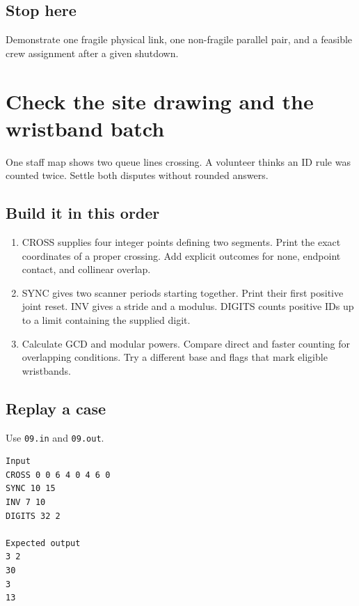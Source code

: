 \documentclass[11pt,letterpaper]{article}
\begin{document}
\subsection*{Stop here}

Demonstrate one fragile physical link, one non-fragile parallel pair, and a feasible crew assignment after a given shutdown.

\clearpage

\section{Check the site drawing and the wristband batch}\label{festival:09}

One staff map shows two queue lines crossing. A volunteer thinks an ID rule was counted twice. Settle both disputes without rounded answers.

\subsection*{Build it in this order}

\begin{enumerate}
\item CROSS supplies four integer points defining two segments. Print the exact coordinates of a proper crossing. Add explicit outcomes for none, endpoint contact, and collinear overlap.
\item SYNC gives two scanner periods starting together. Print their first positive joint reset. INV gives a stride and a modulus. DIGITS counts positive IDs up to a limit containing the supplied digit.
\item Calculate GCD and modular powers. Compare direct and faster counting for overlapping conditions. Try a different base and flags that mark eligible wristbands.
\end{enumerate}

\subsection*{Replay a case}

Use \texttt{09.in} and \texttt{09.out}.

\begin{samepage}
\small
\begin{verbatim}
Input
CROSS 0 0 6 4 0 4 6 0
SYNC 10 15
INV 7 10
DIGITS 32 2

Expected output
3 2
30
3
13
\end{verbatim}
\end{samepage}
\end{document}
